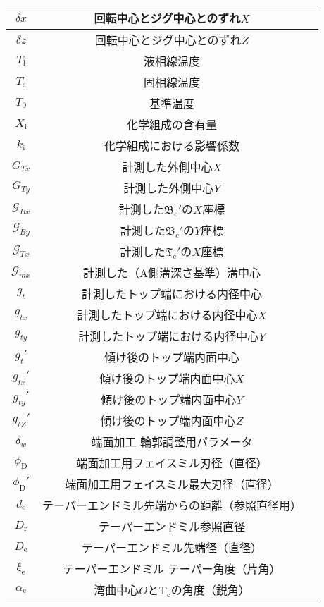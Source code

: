 \begin{longtable}{|c|Sl|}
$\delta x$ & 回転中心とジグ中心とのずれ$X$\\\hline
$\delta z$ & 回転中心とジグ中心とのずれ$Z$\\\hline
$T_\mathrm l$ & 液相線温度\\\hline
$T_\mathrm s$ & 固相線温度\\\hline
$T_0$ & 基準温度\\\hline
$X_\mathrm i$ & 化学組成の含有量\\\hline
$k_\mathrm i$ & 化学組成における影響係数\\\hline
\hline
$G_{Tx}$ & 計測した外側中心$X$\\\hline
$G_{Ty}$ & 計測した外側中心$Y$\\\hline
$\mathcal G_{Bx}$ & 計測した$\mathfrak B_\mathrm c'$の$X$座標\\\hline
$\mathcal G_{By}$ & 計測した$\mathfrak B_\mathrm c'$の$Y$座標\\\hline
$\mathcal G_{Tx}$ & 計測した$\mathfrak T_\mathrm c'$の$X$座標\\\hline
$\mathcal G_{mx}$ & 計測した（A側溝深さ基準）溝中心\\\hline
$g_t$ & 計測したトップ端における内径中心\\\hline
$g_{tx}$ & 計測したトップ端における内径中心$X$\\\hline
$g_{ty}$ & 計測したトップ端における内径中心$Y$\\\hline
$g_t'$ & 傾け後のトップ端内面中心\\\hline
$g_{tx}'$ & 傾け後のトップ端内面中心$X$\\\hline
$g_{ty}'$ & 傾け後のトップ端内面中心$Y$\\\hline
$g_{tZ}'$ & 傾け後のトップ端内面中心$Z$\\\hline
\hline
$\delta_w$ & 端面加工 輪郭調整用パラメータ\\\hline
$\phi_\mathrm D$ & 端面加工用フェイスミル刃径（直径）\\\hline
$\phi_\mathrm D'$ & 端面加工用フェイスミル最大刃径（直径）\\\hline
$d_\mathrm e$ & テーパーエンドミル先端からの距離（参照直径用）\\\hline
$D_\mathrm r$ & テーパーエンドミル参照直径\\\hline
$D_\mathrm e$ & テーパーエンドミル先端径（直径）\\\hline
$\xi_\mathrm e$ & テーパーエンドミル テーパー角度（片角）\\\hline
\hline
$\alpha_{\mathrm c}$ & 湾曲中心$O$と$\mathrm T_\mathrm c$の角度（鋭角）\\\hline

\end{longtable}
